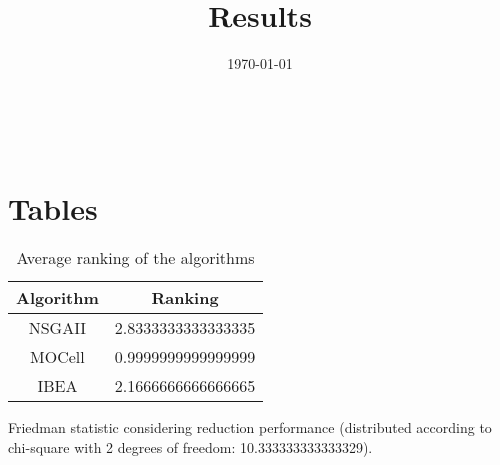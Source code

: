 \documentclass{article}
\title{Results}
\author{}
\date{\today}
\begin{document}
\oddsidemargin 0in \topmargin 0in\maketitle
\
\section{Tables}
\begin{table}[!htp]
\centering
\caption{Average ranking of the algorithms}
\begin{tabular}{c|c}
Algorithm&Ranking\\
\hline
NSGAII&2.8333333333333335\\
MOCell&0.9999999999999999\\
IBEA&2.1666666666666665\\
\end{tabular}
\end{table}


Friedman statistic considering reduction performance (distributed according to chi-square with 2 degrees of freedom: 10.333333333333329).
\end{document}
